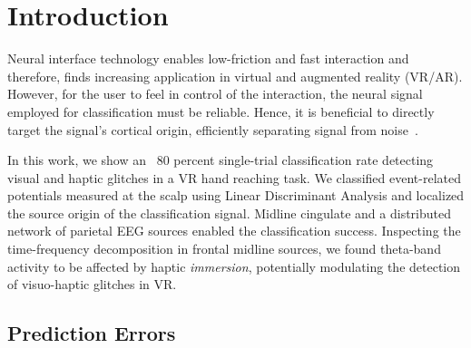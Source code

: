 \section{Introduction}
Neural interface technology enables low-friction and fast interaction and therefore, finds increasing application in virtual and augmented reality (VR/AR). However, for the user to feel in control of the interaction, the neural signal employed for classification must be reliable. Hence, it is beneficial to directly target the signal's cortical origin, efficiently separating signal from noise~\cite{Zander2016}.

In this work, we show an ~80 percent single-trial classification rate detecting visual and haptic glitches in a VR hand reaching task. We classified event-related potentials measured at the scalp using Linear Discriminant Analysis and localized the source origin of the classification signal. Midline cingulate and a distributed network of parietal EEG sources enabled the classification success. Inspecting the time-frequency decomposition in frontal midline sources, we found theta-band activity to be affected by haptic \textit{immersion}, potentially modulating the detection of visuo-haptic glitches in VR.


\subsection{Prediction Errors} %




